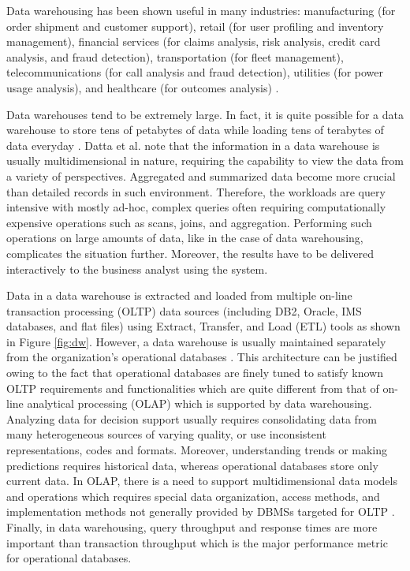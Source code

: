 \documentclass[12pt,a4paper]{article}
\begin{document}
Data warehousing has been shown useful in many industries: manufacturing (for order shipment and customer support), retail (for user profiling and inventory
management), financial services (for claims analysis, risk analysis, credit card analysis, and fraud detection), transportation (for fleet management),
telecommunications (for call analysis and fraud detection), utilities (for power usage analysis), and healthcare (for outcomes analysis)
\cite{chaudhuri1997overview}.

Data warehouses tend to be extremely large. In fact, it is quite possible for a data warehouse to store tens of petabytes of data while loading tens of
terabytes
of data everyday \cite{thusoo2010data}. Datta et al. \cite {datta2002parallel} note that the information in a data warehouse is usually multidimensional in
nature, requiring the capability to view the data from a variety of perspectives. Aggregated and summarized data become more crucial than detailed records in
such environment. Therefore, the workloads are query intensive with mostly ad-hoc, complex queries often requiring computationally expensive operations such as
scans, joins, and aggregation. Performing such operations on large amounts of data, like in the case of data warehousing, complicates the situation further.
Moreover, the results have to be delivered interactively to the business analyst using the system.

Data in a data warehouse is extracted and loaded from multiple on-line transaction processing (OLTP) data sources (including DB2, Oracle, IMS
databases, and flat files) using Extract, Transfer, and Load (ETL) tools as shown in Figure \ref{fig:dw}. However, a data warehouse is usually maintained
separately from the
organization's operational databases \cite{sen2005comparison, chaudhuri1997overview}. This architecture can be justified owing to the fact that operational
databases are finely tuned to satisfy known OLTP requirements and functionalities which are quite different from that of on-line analytical processing (OLAP)
which is supported by data warehousing. Analyzing data for decision support usually requires consolidating data from many heterogeneous sources of varying
quality, or use inconsistent representations, codes and formats. Moreover, understanding trends or making predictions requires historical data, whereas
operational databases store only current data. In OLAP, there is a need to support multidimensional data models and operations which requires special data
organization, access methods, and implementation methods not generally provided by DBMSs targeted for OLTP \cite{chaudhuri1997overview}. Finally, in data
warehousing, query throughput and response times are more important than transaction throughput which is the major performance metric for operational databases.
\end{document}
